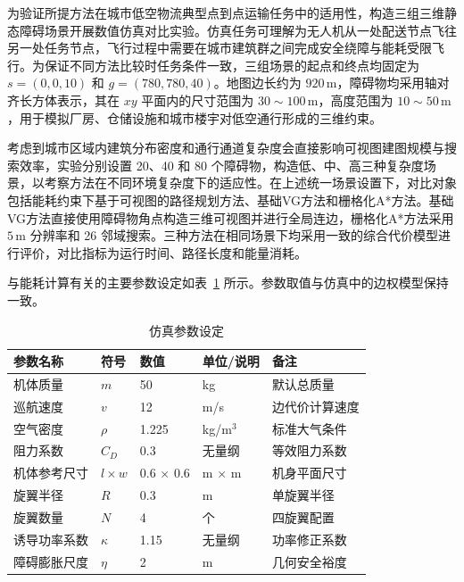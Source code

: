 为验证所提方法在城市低空物流典型点到点运输任务中的适用性，构造三组三维静态障碍场景开展数值仿真对比实验。仿真任务可理解为无人机从一处配送节点飞往另一处任务节点，飞行过程中需要在城市建筑群之间完成安全绕障与能耗受限飞行。为保证不同方法比较时任务条件一致，三组场景的起点和终点均固定为 \(s=(0,0,10)\) 和 \(g=(780,780,40)\)。地图边长约为 \(920\,\mathrm{m}\)，障碍物均采用轴对齐长方体表示，其在 \(xy\) 平面内的尺寸范围为 \(30\sim100\,\mathrm{m}\)，高度范围为 \(10\sim50\,\mathrm{m}\)，用于模拟厂房、仓储设施和城市楼宇对低空通行形成的三维约束。

考虑到城市区域内建筑分布密度和通行通道复杂度会直接影响可视图建图规模与搜索效率，实验分别设置 20、40 和 80 个障碍物，构造低、中、高三种复杂度场景，以考察方法在不同环境复杂度下的适应性。在上述统一场景设置下，对比对象包括能耗约束下基于可视图的路径规划方法、基础VG方法和栅格化A*方法。基础VG方法直接使用障碍物角点构造三维可视图并进行全局连边，栅格化A*方法采用 \(5\,\mathrm{m}\) 分辨率和 26 邻域搜索。三种方法在相同场景下均采用一致的综合代价模型进行评价，对比指标为运行时间、路径长度和能量消耗。

与能耗计算有关的主要参数设定如表~\ref{tab:drone-params} 所示。参数取值与仿真中的边权模型保持一致。

\begin{table}[htbp]
    \centering
    \caption{仿真参数设定}
    \label{tab:drone-params}
    \begin{tabular}{p{}p{}p{}p{}p{}}
        \hline
        参数名称 & 符号 & 数值 & 单位/说明 & 备注 \\
        \hline
        机体质量 & \(m\) & 50 & kg & 默认总质量 \\
        巡航速度 & \(v\) & 12 & m/s & 边代价计算速度 \\
        空气密度 & \(\rho\) & 1.225 & kg/m$^3$ & 标准大气条件 \\
        阻力系数 & \(C_D\) & 0.3 & 无量纲 & 等效阻力系数 \\
        机体参考尺寸 & \(l\times w\) & 0.6 \(\times\) 0.6 & m \(\times\) m & 机身平面尺寸 \\
        旋翼半径 & \(R\) & 0.3 & m & 单旋翼半径 \\
        旋翼数量 & \(N\) & 4 & 个 & 四旋翼配置 \\
        诱导功率系数 & \(\kappa\) & 1.15 & 无量纲 & 功率修正系数 \\
        障碍膨胀尺度 & \(\eta\) & 2 & m & 几何安全裕度 \\
        \hline
    \end{tabular}
\end{table}

